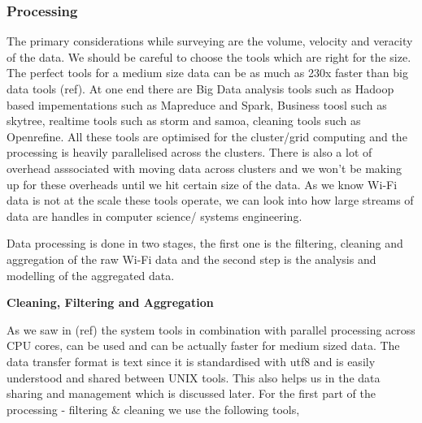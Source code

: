 \subsubsection{Processing}

The primary considerations while surveying are the volume, velocity and veracity
of the data.
We should be careful to choose the tools which are right for the size.
The perfect tools for a medium size data can be as much as 230x faster than big data tools (ref).
At one end there are Big Data analysis tools such as Hadoop based impementations such as Mapreduce and Spark, Business toosl such as skytree, realtime tools such as storm and samoa, cleaning tools such as Openrefine.
All these tools are optimised for the cluster/grid computing and the processing is heavily parallelised across the clusters.
There is also a lot of overhead asssociated with moving data across clusters and we won't be making up for these overheads until we hit certain size of the data.
As we know Wi-Fi data is not at the scale these tools operate, we can look into how large streams of data are handles in computer science/ systems engineering.

Data processing is done in two stages, the first one is the filtering, cleaning and aggregation of the raw Wi-Fi data and the second step is the analysis and modelling of the aggregated data.


\textbf{Cleaning, Filtering and Aggregation}

As we saw in (ref) the system tools in combination with parallel processing across CPU cores, can be used and can be actually faster for medium sized data.
The data transfer format is text since it is standardised with utf8 and is easily understood and shared between UNIX tools.
This also helps us in the data sharing and management which is discussed later.
For the first part of the processing - filtering \& cleaning we use the following tools,

